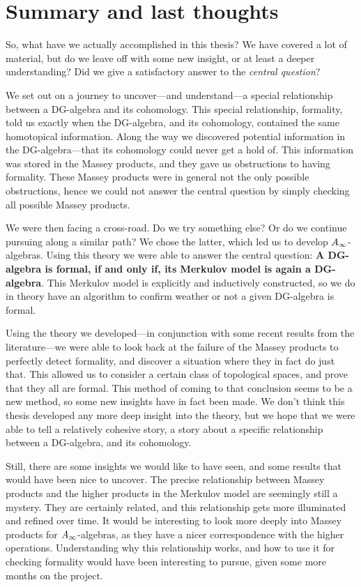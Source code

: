 \clearpage
\section{Summary and last thoughts}

So, what have we actually accomplished in this thesis? We have covered a lot of material, but do we leave off with some new insight, or at least a deeper understanding? Did we give a satisfactory answer to the \emph{central question}?

We set out on a journey to uncover---and understand---a special relationship between a DG-algebra and its cohomology. This special relationship, formality, told us exactly when the DG-algebra, and its cohomology, contained the same homotopical information. Along the way we discovered potential information in the DG-algebra---that its cohomology could never get a hold of. This information was stored in the Massey products, and they gave us obstructions to having formality. These Massey products were in general not the only possible obstructions, hence we could not answer the central question by simply checking all possible Massey products. 

We were then facing a cross-road. Do we try something else? Or do we continue pursuing along a similar path? We chose the latter, which led us to develop $A_{\infty}$-algebras. Using this theory we were able to answer the central question: \textbf{A DG-algebra is formal, if and only if, its Merkulov model is again a DG-algebra}. This Merkulov model is explicitly and inductively constructed, so we do in theory have an algorithm to confirm weather or not a given DG-algebra is formal. 

Using the theory we developed---in conjunction with some recent results from the literature---we were able to look back at the failure of the Massey products to perfectly detect formality, and discover a situation where they in fact do just that. This allowed us to consider a certain class of topological spaces, and prove that they all are formal. This method of coming to that conclusion seems to be a new method, so some new insights have in fact been made. We don't think this thesis developed any more deep insight into the theory, but we hope that we were able to tell a relatively cohesive story, a story about a specific relationship between a DG-algebra, and its cohomology. 

Still, there are some insights we would like to have seen, and some results that would have been nice to uncover. The precise relationship between Massey products and the higher products in the Merkulov model are seemingly still a mystery. They are certainly related, and this relationship gets more illuminated and refined over time. It would be interesting to look more deeply into Massey products for $A_{\infty}$-algebras, as they have a nicer correspondence with the higher operations. Understanding why this relationship works, and how to use it for checking formality would have been interesting to pursue, given some more months on the project. 


